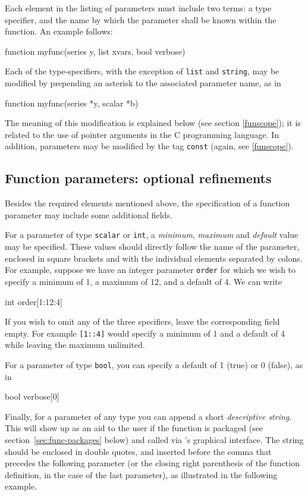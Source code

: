 Each element in the listing of parameters must include two terms: a
type specifier, and the name by which the parameter shall be known
within the function.  An example follows:
%    
\begin{code}
function myfunc(series y, list xvars, bool verbose)
\end{code}

Each of the type-specifiers, with the exception of \texttt{list} and
\texttt{string}, may be modified by prepending an asterisk to the
associated parameter name, as in
%    
\begin{code}
function myfunc(series *y, scalar *b)
\end{code}

The meaning of this modification is explained below (see section
\ref{funscope}); it is related to the use of pointer arguments in the
C programming language.  In addition, parameters may be modified by
the tag \texttt{const} (again, see \ref{funscope}).

\subsection{Function parameters: optional refinements}

Besides the required elements mentioned above, the specification of a
function parameter may include some additional fields.

For a parameter of type \texttt{scalar} or \texttt{int}, a
\textsl{minimum}, \textsl{maximum} and \textsl{default} value may be
specified.  These values should directly follow the name of the
parameter, enclosed in square brackets and with the individual
elements separated by colons.  For example, suppose we have an integer
parameter \texttt{order} for which we wish to specify a minimum of 1,
a maximum of 12, and a default of 4.  We can write
%    
\begin{code}
int order[1:12:4]
\end{code} 
%
If you wish to omit any of the three specifiers, leave the
corresponding field empty.  For example \texttt{[1::4]} would specify
a minimum of 1 and a default of 4 while leaving the maximum
unlimited.  

For a parameter of type \texttt{bool}, you can specify a default of
1 (true) or 0 (false), as in
%    
\begin{code}
bool verbose[0]
\end{code} 
%

Finally, for a parameter of any type you can append a short
\textsl{descriptive string}.  This will show up as an aid to the user
if the function is packaged (see section~\ref{sec:func-packages}
below) and called via 's graphical interface.  The string
should be enclosed in double quotes, and inserted before the comma
that precedes the following parameter (or the closing right
parenthesis of the function definition, in the case of the last
parameter), as illustrated in the following example.


